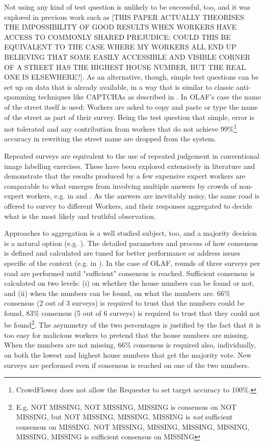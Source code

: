         Not using any kind of test question is unlikely to be successful, too, and it was explored in previous work such as \cite{DellaPenna:tf} [THIS PAPER ACTUALLY THEORISES THE IMPOSSIBILITY OF GOOD RESULTS WHEN WORKERS HAVE ACCESS TO COMMONLY SHARED PREJUDICE: COULD THIS BE EQUIVALENT TO THE CASE WHERE MY WORKERS ALL END UP BELIEVING THAT SOME EASILY ACCESSIBLE AND VISIBLE CORNER OF A STREET HAS THE HIGHEST HOUSE NUMBER, BUT THE REAL ONE IS ELSEWHERE?]. As an alternative, though, simple test questions can be set up on data that is already available, in a way that is similar to classic anti-spamming techniques like CAPTCHAs as described in \cite{Difallah:2012ty}. In OLAF's case the name of the street itself is used: Workers are asked to copy and paste or type the name of the street as part of their survey. Being the test question that simple, error is not tolerated and any contribution from workers that do not achieve 99\%\footnote{CrowdFlower does not allow the Requester to set target accuracy to 100\%.} accuracy in rewriting the street name are dropped from the system.

        Repeated surveys are equivalent to the use of repeated judgement in conventional image labelling exercises. These have been explored extensively in literature and demonstrate that the results produced by a few expensive expert workers are comparable to what emerges from involving multiple answers by crowds of non-expert workers, e.g. in \cite{Snow:2008wo} and \cite{Sheng:2008gra}. As the answers are inevitably noisy, the same road is offered to survey to different Workers, and their responses aggregated to decide what is the most likely and truthful observation. 
        
        Approaches to aggregation is a well studied subject, too, and a majority decision is a natural option (e.g. \cite{Le:2010ug}). The detailed parameters and process of how consensus is defined and calculated are tuned for better performance or address issues specific of the context (e.g. in \cite{Hirth:2011fh}). In the case of OLAF, rounds of three surveys per road are performed until "sufficient" consensus is reached. Sufficient consensus is calculated on two levels: (i) on whether the house numbers can be found or not, and (ii) when the numbers can be found, on what the numbers are. 66\% consensus (2 out of 3 surveys) is required to trust that the numbers could be found, 83\% consensus (5 out of 6 surveys) is required to trust that they could not be found\footnote{E.g. { NOT MISSING, NOT MISSING, MISSING } is consensus on NOT MISSING, but { NOT MISSING, MISSING, MISSING } is {\it not} sufficient consensus on MISSING. { NOT MISSING, MISSING, MISSING, MISSING, MISSING, MISSING } is sufficient consensus on MISSING}. The asymmetry of the two percentages is justified by the fact that it is too easy for malicious workers to pretend that the house numbers are missing. When the numbers are not missing, 66\% consensus is required also, individually, on both the lowest and highest house numbers that get the majority vote. New surveys are performed even if consensus is reached on one of the two numbers.
    
